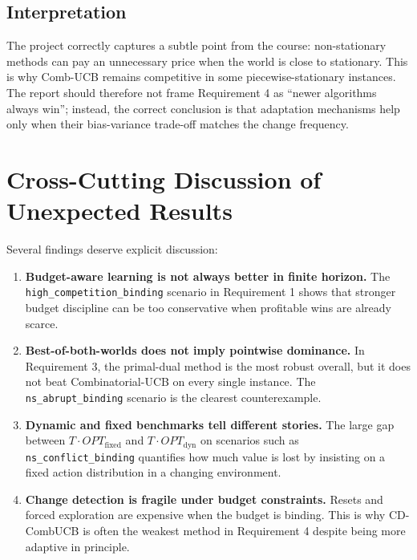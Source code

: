 \documentclass[11pt,a4paper]{article}
\begin{document}
\subsection{Interpretation}

The project correctly captures a subtle point from the course: non-stationary
methods can pay an unnecessary price when the world is close to stationary. This
is why Comb-UCB remains competitive in some piecewise-stationary instances. The
report should therefore not frame Requirement 4 as ``newer algorithms always win'';
instead, the correct conclusion is that adaptation mechanisms help only when
their bias-variance trade-off matches the change frequency.

\section{Cross-Cutting Discussion of Unexpected Results}

Several findings deserve explicit discussion:

\begin{enumerate}
  \item \textbf{Budget-aware learning is not always better in finite horizon.}
  The \texttt{high\_competition\_binding} scenario in Requirement 1 shows that
  stronger budget discipline can be too conservative when profitable wins are
  already scarce.

  \item \textbf{Best-of-both-worlds does not imply pointwise dominance.}
  In Requirement 3, the primal-dual method is the most robust overall, but it
  does not beat Combinatorial-UCB on every single instance. The
  \texttt{ns\_abrupt\_binding} scenario is the clearest counterexample.

  \item \textbf{Dynamic and fixed benchmarks tell different stories.}
  The large gap between $T\cdot OPT_{\text{fixed}}$ and
  $T\cdot OPT_{\text{dyn}}$ on scenarios such as
  \texttt{ns\_conflict\_binding} quantifies how much value is lost by insisting
  on a fixed action distribution in a changing environment.

  \item \textbf{Change detection is fragile under budget constraints.}
  Resets and forced exploration are expensive when the budget is binding. This is
  why CD-CombUCB is often the weakest method in Requirement 4 despite being more
  adaptive in principle.
\end{enumerate}
\end{document}
